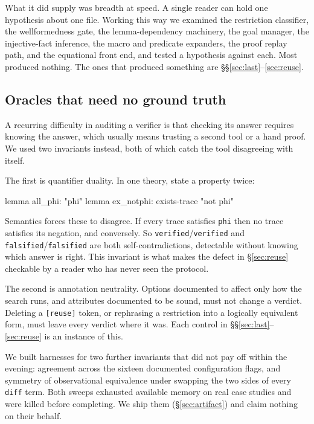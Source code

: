 \documentclass[version=preprint]{iacrcc}
\newcommand{\code}[1]{\texttt{\small #1}}
\theoremstyle{definition}
\theoremstyle{remark}
\begin{document}
What it did supply was breadth at speed. A single reader can hold one
hypothesis about one file. Working this way we examined the restriction
classifier, the wellformedness gate, the lemma-dependency machinery, the goal
manager, the injective-fact inference, the macro and predicate expanders, the
proof replay path, and the equational front end, and tested a hypothesis
against each. Most produced nothing. The ones that produced something are
\S\S\ref{sec:last}--\ref{sec:reuse}.

\subsection{Oracles that need no ground truth}\label{sec:oracles}

A recurring difficulty in auditing a verifier is that checking its answer
requires knowing the answer, which usually means trusting a second tool or a
hand proof. We used two invariants instead, both of which catch the tool
disagreeing with itself.

The first is quantifier duality. In one theory, state a property twice:
\begin{tmlisting}
	lemma all_phi:            "phi"
	lemma ex_notphi: exists-trace "not phi"
\end{tmlisting}
Semantics forces these to disagree. If every trace satisfies \code{phi} then no
trace satisfies its negation, and conversely. So \code{verified}/\code{verified}
and \code{falsified}/\code{falsified} are both self-contradictions, detectable
without knowing which answer is right. This invariant is what makes the defect
in \S\ref{sec:reuse} checkable by a reader who has never seen the protocol.

The second is annotation neutrality. Options documented to affect only how the
search runs, and attributes documented to be sound, must not change a verdict.
Deleting a \code{[reuse]} token, or rephrasing a restriction into a logically
equivalent form, must leave every verdict where it was. Each control in
\S\S\ref{sec:last}--\ref{sec:reuse} is an instance of this.

We built harnesses for two further invariants that did not pay off within the
evening: agreement across the sixteen documented configuration flags, and
symmetry of observational equivalence under swapping the two sides of every
\code{diff} term. Both sweeps exhausted available memory on real case studies
and were killed before completing. We ship them (\S\ref{sec:artifact}) and
claim nothing on their behalf.
\end{document}

